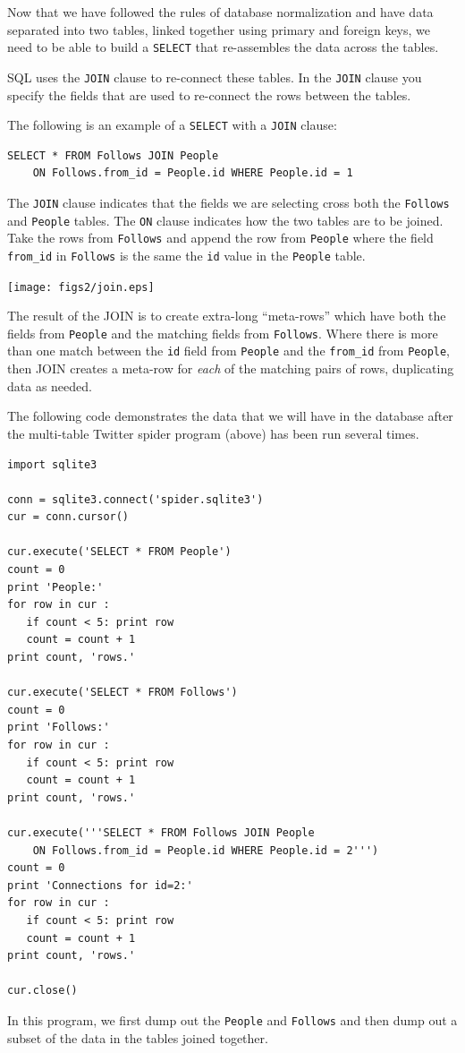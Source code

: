 Now that we have followed the rules of database normalization
and have data separated into two tables, linked together using
primary and foreign keys, we need to be able to build a 
{\tt SELECT} that re-assembles the data across the tables.

SQL uses the {\tt JOIN} clause to re-connect these tables.  
In the {\tt JOIN} clause you specify the fields that are used 
to re-connect the rows between the tables.

The following is an example of a {\tt SELECT} with a 
{\tt JOIN} clause:

\beforeverb
\begin{verbatim}
SELECT * FROM Follows JOIN People 
    ON Follows.from_id = People.id WHERE People.id = 1
\end{verbatim}
\afterverb
%
The {\tt JOIN} clause indicates that the fields we are selecting
cross both the {\tt Follows} and {\tt People} tables.  The {\tt ON}
clause indicates how the two tables are to be joined.   Take the rows
from {\tt Follows} and append the row from {\tt People} where the
field \verb"from_id" in {\tt Follows} is the same the {\tt id} value
in the {\tt People} table.

\beforefig
\centerline{\texttt{[image: figs2/join.eps]}}
\afterfig

The result of the JOIN is to create extra-long ``meta-rows'' which have both 
the fields from {\tt People} and the matching fields from {\tt Follows}.
Where there is more than one match between the {\tt id} field from {\tt People}
and the \verb"from_id" from {\tt People}, then JOIN creates a meta-row 
for \emph{each} of the matching pairs of rows, duplicating data as needed.

The following code demonstrates the data that we will have in the 
database after the multi-table Twitter spider program (above) has
been run several times.

\beforeverb
\begin{verbatim}
import sqlite3

conn = sqlite3.connect('spider.sqlite3')
cur = conn.cursor()

cur.execute('SELECT * FROM People')
count = 0
print 'People:'
for row in cur :
   if count < 5: print row
   count = count + 1
print count, 'rows.'

cur.execute('SELECT * FROM Follows')
count = 0
print 'Follows:'
for row in cur :
   if count < 5: print row
   count = count + 1
print count, 'rows.'

cur.execute('''SELECT * FROM Follows JOIN People 
    ON Follows.from_id = People.id WHERE People.id = 2''')
count = 0
print 'Connections for id=2:'
for row in cur :
   if count < 5: print row
   count = count + 1
print count, 'rows.'

cur.close()
\end{verbatim}
\afterverb
%
In this program, we first dump out the {\tt People}
and {\tt Follows} and then dump out a subset of the
data in the tables joined together.

